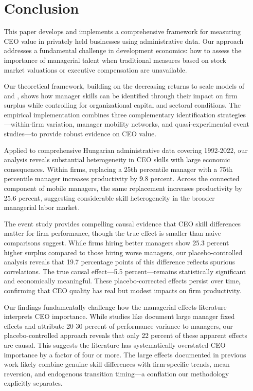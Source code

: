 \documentclass[11pt,a4paper]{article}
\begin{document}
\section{Conclusion}

This paper develops and implements a comprehensive framework for measuring CEO value in privately held businesses using administrative data. Our approach addresses a fundamental challenge in development economics: how to assess the importance of managerial talent when traditional measures based on stock market valuations or executive compensation are unavailable.

Our theoretical framework, building on the decreasing returns to scale models of \citet{AtkesonKehoe2005JPE} and \citet{McGrattan2012RED}, shows how manager skills can be identified through their impact on firm surplus while controlling for organizational capital and sectoral conditions. The empirical implementation combines three complementary identification strategies---within-firm variation, manager mobility networks, and quasi-experimental event studies---to provide robust evidence on CEO value.

Applied to comprehensive Hungarian administrative data covering 1992-2022, our analysis reveals substantial heterogeneity in CEO skills with large economic consequences. Within firms, replacing a 25th percentile manager with a 75th percentile manager increases productivity by 9.8 percent. Across the connected component of mobile managers, the same replacement increases productivity by 25.6 percent, suggesting considerable skill heterogeneity in the broader managerial labor market.

The event study provides compelling causal evidence that CEO skill differences matter for firm performance, though the true effect is smaller than naive comparisons suggest. While firms hiring better managers show 25.3 percent higher surplus compared to those hiring worse managers, our placebo-controlled analysis reveals that 19.7 percentage points of this difference reflects spurious correlations. The true causal effect---5.5 percent---remains statistically significant and economically meaningful. These placebo-corrected effects persist over time, confirming that CEO quality has real but modest impacts on firm productivity.

Our findings fundamentally challenge how the managerial effects literature interprets CEO importance. While studies like \citet{Bertrand2003-io} document large manager fixed effects and \citet{metcalfe2023managers} attribute 20-30 percent of performance variance to managers, our placebo-controlled approach reveals that only 22 percent of these apparent effects are causal. This suggests the literature has systematically overstated CEO importance by a factor of four or more. The large effects documented in previous work likely combine genuine skill differences with firm-specific trends, mean reversion, and endogenous transition timing---a conflation our methodology explicitly separates.
\end{document}
